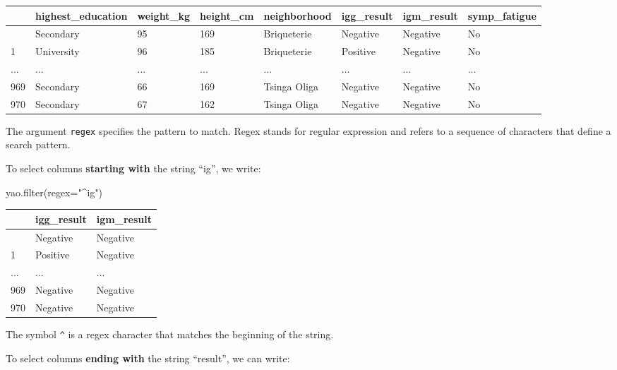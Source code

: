 \documentclass[
  letterpaper,
  DIV=11,
  numbers=noendperiod]{scrreprt}
\newenvironment{Shaded}{\begin{snugshade}}{\end{snugshade}}
\newcommand{\BuiltInTok}[1]{\textcolor[rgb]{0.00,0.23,0.31}{#1}}
\newcommand{\NormalTok}[1]{\textcolor[rgb]{0.00,0.23,0.31}{#1}}
\newcommand{\OperatorTok}[1]{\textcolor[rgb]{0.37,0.37,0.37}{#1}}
\newcommand{\StringTok}[1]{\textcolor[rgb]{0.13,0.47,0.30}{#1}}
\begin{document}
\begin{longtable}[]{@{}llllllll@{}}
\toprule\noalign{}
& highest\_education & weight\_kg & height\_cm & neighborhood &
igg\_result & igm\_result & symp\_fatigue \\
\midrule\noalign{}
\endhead
\bottomrule\noalign{}
\endlastfoot
0 & Secondary & 95 & 169 & Briqueterie & Negative & Negative & No \\
1 & University & 96 & 185 & Briqueterie & Positive & Negative & No \\
... & ... & ... & ... & ... & ... & ... & ... \\
969 & Secondary & 66 & 169 & Tsinga Oliga & Negative & Negative & No \\
970 & Secondary & 67 & 162 & Tsinga Oliga & Negative & Negative & No \\
\end{longtable}

The argument \texttt{regex} specifies the pattern to match. Regex stands
for regular expression and refers to a sequence of characters that
define a search pattern.

To select columns \textbf{starting with} the string ``ig'', we write:

\begin{Shaded}
\begin{Highlighting}[]
\NormalTok{yao.}\BuiltInTok{filter}\NormalTok{(regex}\OperatorTok{=}\StringTok{"\^{}ig"}\NormalTok{)}
\end{Highlighting}
\end{Shaded}

\begin{longtable}[]{@{}lll@{}}
\toprule\noalign{}
& igg\_result & igm\_result \\
\midrule\noalign{}
\endhead
\bottomrule\noalign{}
\endlastfoot
0 & Negative & Negative \\
1 & Positive & Negative \\
... & ... & ... \\
969 & Negative & Negative \\
970 & Negative & Negative \\
\end{longtable}

The symbol \texttt{\^{}} is a regex character that matches the beginning
of the string.

To select columns \textbf{ending with} the string ``result'', we can
write:

\begin{Shaded}
\end{Shaded}
\end{document}
